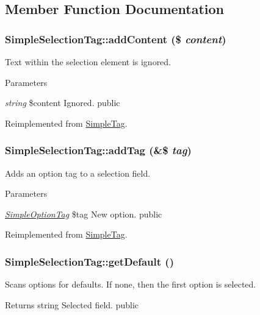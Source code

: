 \subsection{Member Function Documentation}
\hypertarget{class_simple_selection_tag_a168eec24b5c2d95c4e7e0eebfca9f4d7}{
\subsubsection[{addContent}]{\setlength{\rightskip}{0pt plus 5cm}SimpleSelectionTag::addContent (\$ {\em content})}}
\label{class_simple_selection_tag_a168eec24b5c2d95c4e7e0eebfca9f4d7}
Text within the selection element is ignored. 
\begin{DoxyParams}{Parameters}
\item[{\em string}]\$content Ignored.  public \end{DoxyParams}


Reimplemented from \hyperlink{class_simple_tag_ae8478a7c35ab3c16e8284667cd5f0bd5}{SimpleTag}.\hypertarget{class_simple_selection_tag_aa7547a0f3b171987ad686049822a1446}{
\subsubsection[{addTag}]{\setlength{\rightskip}{0pt plus 5cm}SimpleSelectionTag::addTag (\&\$ {\em tag})}}
\label{class_simple_selection_tag_aa7547a0f3b171987ad686049822a1446}
Adds an option tag to a selection field. 
\begin{DoxyParams}{Parameters}
\item[{\em \hyperlink{class_simple_option_tag}{SimpleOptionTag}}]\$tag New option.  public \end{DoxyParams}


Reimplemented from \hyperlink{class_simple_tag_a5f5cc331c052dd6eb0bd104f68143c76}{SimpleTag}.\hypertarget{class_simple_selection_tag_ab515be0efa0968f8e74f3ed2312b3463}{
\subsubsection[{getDefault}]{\setlength{\rightskip}{0pt plus 5cm}SimpleSelectionTag::getDefault ()}}
\label{class_simple_selection_tag_ab515be0efa0968f8e74f3ed2312b3463}
Scans options for defaults. If none, then the first option is selected. \begin{DoxyReturn}{Returns}
string Selected field.  public 
\end{DoxyReturn}


